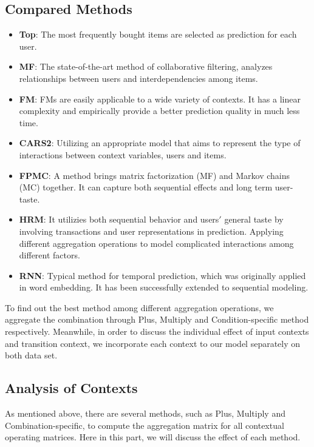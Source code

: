 \documentclass[conference]{IEEEtran}
\begin{document}
\subsection{Compared Methods}
\begin{itemize}
\item \textbf{Top}: 
The most frequently bought items are selected as prediction for each user.
\item \textbf{MF}: 
The state-of-the-art method of collaborative filtering, analyzes relationships between users and interdependencies among items.
\item \textbf{FM}: 
FMs are easily applicable to a wide variety of contexts. It has a linear complexity and empirically provide a better prediction quality in much less time.
\item \textbf{CARS2}: 
Utilizing an appropriate model that aims to represent the type of interactions between context variables, users and items.
\item \textbf{FPMC}: 
A method brings matrix factorization (MF) and Markov chains (MC) together. It can capture
both sequential effects and long term user-taste.
\item \textbf{HRM}: 
It utilizies both sequential behavior and users$'$ general taste by involving transactions and user representations in prediction. Applying different aggregation operations to model complicated interactions among different factors.
\item \textbf{RNN}: 
Typical method for temporal prediction, which was originally applied in word embedding. It has been successfully extended to sequential modeling. 


\end{itemize}
 To find out the best method among different aggregation operations, we aggregate the combination through Plus, Multiply and Condition-specific method respectively. Meanwhile, in order to discuss the individual effect of input contexts and transition context, we incorporate each context to our model separately on both data set. 




\subsection{Analysis of Contexts}
As mentioned above, there are several methods, such as Plus, Multiply and Combination-specific, to compute the aggregation matrix for all contextual operating matrices. Here in this part, we will discuss the effect of each method.
\end{document}
